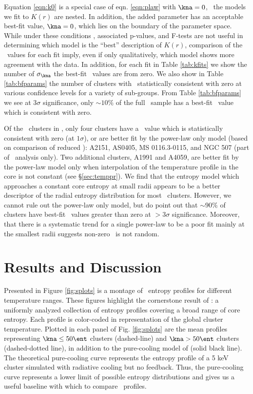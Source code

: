 \documentclass[apj]{emulateapj}
\begin{document}
Equation \ref{eqn:k0} is a special case of eqn. \ref{eqn:plaw} with
$\kna = 0$, \eg\ the models we fit to $K(r)$ are nested. In addition,
the added parameter has an acceptable best-fit value, $\kna = 0$,
which lies on the boundary of the parameter space. While under these
conditions \chisq, associated p-values, and F-tests are not useful in
determining which model is the ``best'' description of $K(r)$,
comparison of the \chisq\ values for each fit imply, even if only
qualitatively, which model shows more agreement with the data. In
addition, for each fit in Table \ref{tab:kfits} we show the number of
$\sigma_{\kna}$ the best-fit \kna\ values are from zero. We also show
in Table \ref{tab:bfparams} the number of clusters with \kna\
statistically consistent with zero at various confidence levels for a
variety of sub-groups. From Table \ref{tab:bfparams} we see at
$3\sigma$ significance, only $\sim10\%$ of the full \accept\ sample
has a best-fit \kna\ value which is consistent with zero.

Of the \numcluster\ clusters in \accept, only four clusters have a
\kna\ value which is statistically consistent with zero (at
$1\sigma$), or are better fit by the power-law only model (based on
comparison of reduced \chisq): A2151, AS0405, MS 0116.3-0115, and NGC
507 (part of \hifl\ analysis only). Two additional clusters, A1991 and
A4059, are better fit by the power-law model only when interpolation
of the temperature profile in the core is not constant (see
\S\ref{sec:temppr}). We find that the entropy model which approaches a
constant core entropy at small radii appears to be a better descriptor
of the radial entropy distribution for most \accept\
clusters. However, we cannot rule out the power-law only model, but do
point out that $\sim90\%$ of clusters have best-fit
\kna\ values greater than zero at $> 3\sigma$ significance. Moreover,
that there is a systematic trend for a single power-law to be a poor
fit mainly at the smallest radii suggests non-zero \kna\ is not
random.

\section{Results and Discussion}
\label{sec:r&d}

Presented in Figure \ref{fig:splots} is a montage of \accept\ entropy
profiles for different temperature ranges. These figures highlight the
cornerstone result of \accept: a uniformly analyzed collection of
entropy profiles covering a broad range of core entropy. Each profile
is color-coded in representation of the global cluster
temperature. Plotted in each panel of Fig. \ref{fig:splots} are the
mean profiles representing $\kna \le 50 \ent$ clusters (dashed-line)
and $\kna > 50 \ent$ clusters (dashed-dotted line), in addition to the
pure-cooling model of \citet{voitbryan} (solid black line). The
theoretical pure-cooling curve represents the entropy profile of a 5
keV cluster simulated with radiative cooling but no feedback. Thus,
the pure-cooling curve represents a lower limit of possible entropy
distributions and gives us a useful baseline with which to compare
\accept\ profiles.
\end{document}
